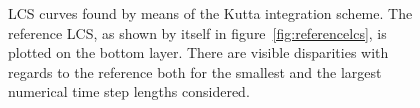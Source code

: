 \begin{figure}[htpb]
    \centering
    
    \caption[LCS curves found by means of the Kutta integration scheme]{
        LCS curves found by means of the Kutta integration scheme. The
        reference LCS, as shown by itself in figure~\ref{fig:referencelcs},
        is plotted on the bottom layer. There are visible disparities with
        regards to the reference both for the smallest and the largest numerical
        time step lengths considered.}
    \label{fig:lcs_rk3}
\end{figure}
